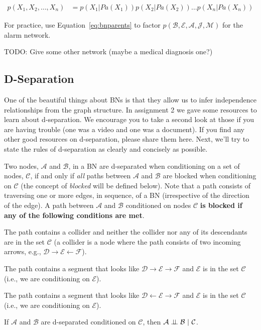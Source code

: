 \documentclass{tufte-handout}
\begin{document}
\begin{align}
p(X_1, X_2, \ldots, X_n) &= p(X_1 | Pa(X_1)) p(X_2 | Pa(X_2)) \ldots p(X_n | Pa(X_n)) \label{eq:bnparents}
\end{align}

\begin{exercise}
For practice, use Equation~\ref{eq:bnparents} to factor $p(\mathcal{B}, \mathcal{E}, \mathcal{A}, \mathcal{J}, \mathcal{M})$ for the alarm network.
\end{exercise}

\begin{exercise}
TODO: Give some other network (maybe a medical diagnosis one?)
\end{exercise}

\subsection{D-Separation}
One of the beautiful things about BNs is that they allow us to infer independence relationships from the graph structure.  In assignment 2 we gave some resources to learn about d-separation.  We encourage you to take a second look at those if you are having trouble (one was a video and one was a document).  If you find any other good resources on d-separation, please share them here.  Next, we'll try to state the rules of d-separation as clearly and concisely as possible.

\begin{recall}
Two nodes, $\mathcal{A}$ and $\mathcal{B}$, in a BN are d-separated when conditioning on a set of nodes, $\mathcal{C}$, if and only if \emph{all} paths between  $\mathcal{A}$ and $\mathcal{B}$ are blocked when conditioning on $\mathcal{C}$ (the concept of \emph{blocked} will be defined below).  Note that a path consists of traversing one or more edges, in sequence, of a BN (irrespective of the direction of the edge).  A path between $\mathcal{A}$ and $\mathcal{B}$ conditioned on nodes $\mathcal{C}$ \textbf{is blocked if any of the following conditions are met}.
\be
\item The path contains a collider and neither the collider nor any of its descendants are in the set $\mathcal{C}$ (a collider is a node where the path consists of two incoming arrows, e.g., $\mathcal{D} \rightarrow \mathcal{E} \leftarrow \mathcal{F}$).
\item The path contains a segment that looks like $\mathcal{D} \rightarrow \mathcal{E} \rightarrow \mathcal{F}$ and $\mathcal{E}$ is in the set $\mathcal{C}$ (i.e., we are conditioning on $\mathcal{E}$).
\item The path contains a segment that looks like $\mathcal{D} \leftarrow \mathcal{E} \rightarrow \mathcal{F}$ and $\mathcal{E}$ is in the set $\mathcal{C}$ (i.e., we are conditioning on $\mathcal{E}$).
\ee


\vspace{1em}
\noindent If $\mathcal{A}$ and $\mathcal{B}$ are d-separated conditioned on $\mathcal{C}$, then $\mathcal{A} \perp\!\!\!\perp \mathcal{B}~|~\mathcal{C}$.

\end{recall}
\end{document}
